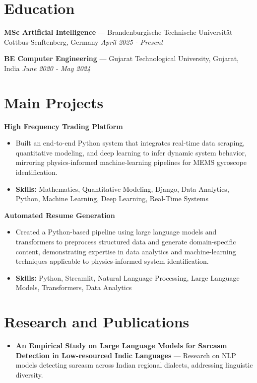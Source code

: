 \documentclass[a4paper,10pt]{article}
\begin{document}
\section*{Education}
\textbf{MSc Artificial Intelligence} — Brandenburgische Technische Universität Cottbus-Senftenberg, Germany \hfill \textit{April 2025 - Present}\par
\vspace{1.5pt}
\textbf{BE Computer Engineering} — Gujarat Technological University, Gujarat, India \hfill \textit{June 2020 - May 2024}\par

\section*{Main Projects}
\textbf{High Frequency Trading Platform}\par
\vspace{1pt}
\begin{itemize}
  \item Built an end-to-end Python system that integrates real-time data scraping, quantitative modeling, and deep learning to infer dynamic system behavior, mirroring physics-informed machine-learning pipelines for MEMS gyroscope identification.
  \item \textbf{Skills:} Mathematics, Quantitative Modeling, Django, Data Analytics, Python, Machine Learning, Deep Learning, Real-Time Systems
\end{itemize}
\vspace{3pt}
\textbf{Automated Resume Generation}\par
\vspace{1pt}
\begin{itemize}
  \item Created a Python-based pipeline using large language models and transformers to preprocess structured data and generate domain-specific content, demonstrating expertise in data analytics and machine-learning techniques applicable to physics-informed system identification.
  \item \textbf{Skills:} Python, Streamlit, Natural Language Processing, Large Language Models, Transformers, Data Analytics
\end{itemize}

\section*{Research and Publications}
\begin{itemize}
\item \textbf{An Empirical Study on Large Language Models for Sarcasm Detection in Low-resourced Indic Languages} — Research on NLP models detecting sarcasm across Indian regional dialects, addressing linguistic diversity.
\end{itemize}
\end{document}
